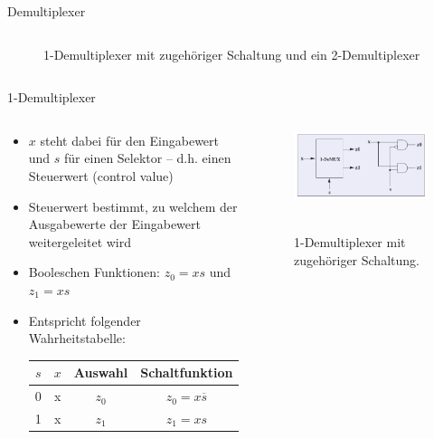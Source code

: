 \documentclass[12pt%
,xcolor=table
,aspectratio=169%
]{beamer}
\begin{document}
\begin{frame}{Demultiplexer}
\begin{columns}[T]
\begin{column}{.48\textwidth}
\begin{figure}
\caption{1-Demultiplexer mit zugehöriger Schaltung und ein 2-Demultiplexer}
\end{figure}
\end{column}%
\end{columns}
\end{frame}


\begin{frame}{1-Demultiplexer}
\begin{columns}[T] %
\begin{column}{.6\textwidth}
\begin{itemize}
		\item $x$ steht dabei für den Eingabewert und $s$ für einen Selektor -- d.h. einen Steuerwert (control value)
		\item Steuerwert bestimmt, zu welchem der Ausgabewerte der Eingabewert weitergeleitet wird
		\item Booleschen Funktionen: $z_0 = xs$ und $z_1 = xs$
		\item Entspricht folgender Wahrheitstabelle:
		\begin{table}[]
\begin{tabular}{|c|c|cc|}
\hline
 \textbf{$s$}& \textbf{$x$}  & \textbf{Auswahl} & \textbf{Schaltfunktion} \\ \hline
0 & x & $z_0$ & $z_0 = x\overline{s}$  \\ \hline
1 & x  & $z_1$ &  $z_1 = xs$ \\ \hline
\end{tabular}
\end{table}
	\end{itemize}
\end{column}%
\hfill%
\begin{column}{.48\textwidth}
\centering
\begin{figure}
\includegraphics[scale=0.3]{pictures/demux1}\
\caption{1-Demultiplexer mit zugehöriger Schaltung.}
\end{figure}
\end{column}%
\end{columns}
\end{frame}
\end{document}
